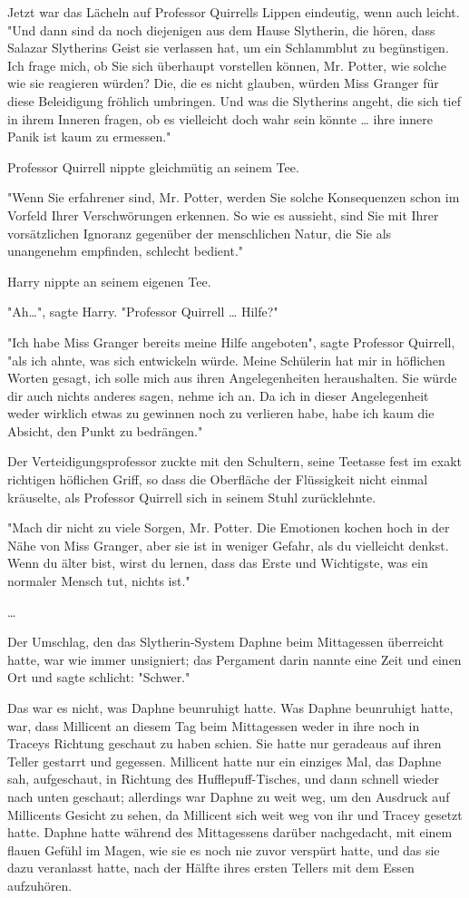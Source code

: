 {Jetzt war das Lächeln auf Professor Quirrells Lippen eindeutig, wenn auch leicht. "Und dann sind da noch diejenigen aus dem Hause Slytherin, die hören, dass Salazar Slytherins Geist sie verlassen hat, um ein Schlammblut zu begünstigen. Ich frage mich, ob Sie sich überhaupt vorstellen können, Mr. Potter, wie solche wie sie reagieren würden? Die, die es nicht glauben, würden Miss Granger für diese Beleidigung fröhlich umbringen. Und was die Slytherins angeht, die sich tief in ihrem Inneren fragen, ob es vielleicht doch wahr sein könnte … ihre innere Panik ist kaum zu ermessen."

Professor Quirrell nippte gleichmütig an seinem Tee.

"Wenn Sie erfahrener sind, Mr. Potter, werden Sie solche Konsequenzen schon im Vorfeld Ihrer Verschwörungen erkennen. So wie es aussieht, sind Sie mit Ihrer vorsätzlichen Ignoranz gegenüber der menschlichen Natur, die Sie als unangenehm empfinden, schlecht bedient."

Harry nippte an seinem eigenen Tee.

"Ah…", sagte Harry. "Professor Quirrell … Hilfe?"

"Ich habe Miss Granger bereits meine Hilfe angeboten", sagte Professor Quirrell, "als ich ahnte, was sich entwickeln würde. Meine Schülerin hat mir in höflichen Worten gesagt, ich solle mich aus ihren Angelegenheiten heraushalten. Sie würde dir auch nichts anderes sagen, nehme ich an. Da ich in dieser Angelegenheit weder wirklich etwas zu gewinnen noch zu verlieren habe, habe ich kaum die Absicht, den Punkt zu bedrängen."

Der Verteidigungsprofessor zuckte mit den Schultern, seine Teetasse fest im exakt richtigen höflichen Griff, so dass die Oberfläche der Flüssigkeit nicht einmal kräuselte, als Professor Quirrell sich in seinem Stuhl zurücklehnte.

"Mach dir nicht zu viele Sorgen, Mr. Potter. Die Emotionen kochen hoch in der Nähe von Miss Granger, aber sie ist in weniger Gefahr, als du vielleicht denkst. Wenn du älter bist, wirst du lernen, dass das Erste und Wichtigste, was ein normaler Mensch tut, nichts ist."

…

Der Umschlag, den das Slytherin-System Daphne beim Mittagessen überreicht hatte, war wie immer unsigniert; das Pergament darin nannte eine Zeit und einen Ort und sagte schlicht: "Schwer."

Das war es nicht, was Daphne beunruhigt hatte. Was Daphne beunruhigt hatte, war, dass Millicent an diesem Tag beim Mittagessen weder in ihre noch in Traceys Richtung geschaut zu haben schien. Sie hatte nur geradeaus auf ihren Teller gestarrt und gegessen. Millicent hatte nur ein einziges Mal, das Daphne sah, aufgeschaut, in Richtung des Hufflepuff-Tisches, und dann schnell wieder nach unten geschaut; allerdings war Daphne zu weit weg, um den Ausdruck auf Millicents Gesicht zu sehen, da Millicent sich weit weg von ihr und Tracey gesetzt hatte. Daphne hatte während des Mittagessens darüber nachgedacht, mit einem flauen Gefühl im Magen, wie sie es noch nie zuvor verspürt hatte, und das sie dazu veranlasst hatte, nach der Hälfte ihres ersten Tellers mit dem Essen aufzuhören.

}
